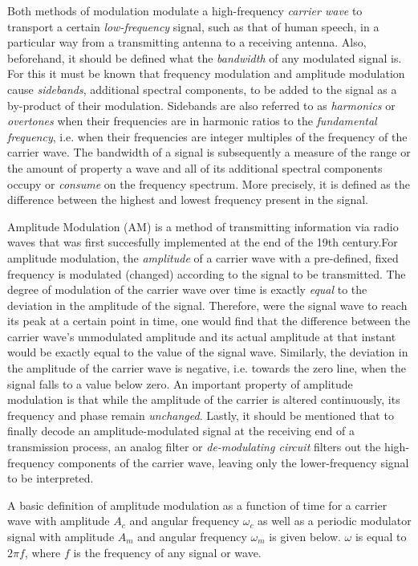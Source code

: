 Both methods of modulation modulate a high-frequency \emph{carrier wave} to transport a certain \emph{low-frequency} signal, such as that of human speech, in a particular way from a transmitting antenna to a receiving antenna. Also, beforehand, it should be defined what the \emph{bandwidth} of any modulated signal is. For this it must be known that frequency modulation and amplitude modulation cause \emph{sidebands}, additional spectral components, to be added to the signal as a by-product of their modulation. Sidebands are also referred to as \emph{harmonics} or \emph{overtones} when their frequencies are in harmonic ratios to the \emph{fundamental frequency}, i.e. when their frequencies are integer multiples of the frequency of the carrier wave. The bandwidth of a signal is subsequently a measure of the range or the amount of property a wave and all of its additional spectral components occupy or \emph{consume} on the frequency spectrum. More precisely, it is defined as the difference between the highest and lowest frequency present in the signal.


Amplitude Modulation (AM) is a method of transmitting information via radio waves that was first succesfully implemented at the end of the 19th century.For amplitude modulation, the \emph{amplitude} of a carrier wave with a pre-defined, fixed frequency is modulated (changed) according to the signal to be transmitted. The degree of modulation of the carrier wave over time is exactly \emph{equal} to the deviation in the amplitude of the signal. Therefore, were the signal wave to reach its peak at a certain point in time, one would find that the difference between the carrier wave's unmodulated amplitude and its actual amplitude at that instant would be exactly equal to the value of the signal wave. Similarly, the deviation in the amplitude of the carrier wave is negative, i.e. towards the zero line, when the signal falls to a value below zero. An important property of amplitude modulation is that while the amplitude of the carrier is altered continuously, its frequency and phase remain \emph{unchanged}. Lastly, it should be mentioned that to finally decode an amplitude-modulated signal at the receiving end of a transmission process, an analog filter or \emph{de-modulating circuit} filters out the high-frequency components of the carrier wave, leaving only the lower-frequency signal to be interpreted.

A basic definition of amplitude modulation as a function of time for a carrier wave with amplitude $A_c$ and angular frequency $\omega_c$ as well as a periodic modulator signal with amplitude $A_m$ and angular frequency $\omega_m$ is given below. $\omega$ is equal to $2 \pi f$, where $f$ is the frequency of any signal or wave. 

